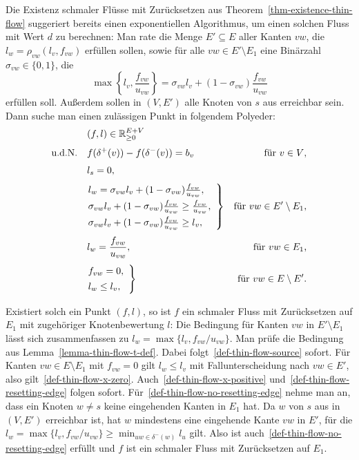 Die Existenz schmaler Flüsse mit Zurücksetzen aus Theorem~\ref{thm-existence-thin-flow} suggeriert bereits einen exponentiellen Algorithmus, um einen solchen Fluss mit Wert $d$ zu berechnen:
Man rate die Menge $E'\subseteq E$ aller Kanten $vw$, die $l_w = \rho_{vw}(l_v, f_{vw})$ erfüllen sollen, sowie für alle $vw\in E'\setminus E_1$ eine Binärzahl $\sigma_{vw}\in\{0,1\}$, die \[
\max\left\{ l_v, \frac{f_{vw}}{u_{vw}}\right\} = \sigma_{vw} l_v + (1-\sigma_{vw}) \frac{f_{vw}}{u_{vw}}
\] erfüllen soll.
Außerdem sollen in $(V, E')$ alle Knoten von $s$ aus erreichbar sein.
Dann suche man einen zulässigen Punkt in folgendem Polyeder:
\begin{align*}
	& (f, l) \in \R_{\geq 0}^{E + V} \\[0.3em]
	\text{u.d.N.}\quad &
	f(\delta^+(v)) - f(\delta^-(v)) = b_v& \text{für $v\in V$,} \\[0.3em]
	& l_s = 0, \\[0.3em]
	&\mathopen{}\left.\begin{array}{@{}l}
		l_w = \sigma_{vw} l_v + (1-\sigma_{vw}) \frac{f_{vw}}{u_{vw}},\\[0.4em]
		\sigma_{vw} l_v + (1-\sigma_{vw}) \frac{f_{vw}}{u_{vw}} \geq \frac{f_{vw}}{u_{vw}},\\[0.4em]
		\sigma_{vw} l_v + (1-\sigma_{vw}) \frac{f_{vw}}{u_{vw}} \geq l_v,
	\end{array} \right\}\mathclose{}
	& \text{für $vw\in E'\setminus E_1$},\\[0.3em]
	& l_w = \frac{f_{vw}}{u_{vw}}, & \text{für $vw\in E_1$,} \\[0.3em]
	& \mathopen{}\left.\begin{array}{@{}l}
	f_{vw} = 0,\\[0.4em]
	l_w \leq l_v,
	\end{array} \right\}\mathclose{} & \text{für $vw\in E\setminus E'$.}
\end{align*}

Existiert solch ein Punkt $(f, l)$, so ist $f$ ein schmaler Fluss mit Zurücksetzen auf $E_1$ mit zugehöriger Knotenbewertung $l$:
Die Bedingung für Kanten $vw$ in $E'\setminus E_1$ lässt sich zusammenfassen zu $l_w = \max \{ l_v, f_{vw}/u_{vw} \}$.
Man prüfe die Bedingung aus Lemma~\ref{lemma-thin-flow-t-def}.
Dabei folgt~\ref{def-thin-flow-source} sofort.
Für Kanten $vw\in E\setminus E_1$ mit $f_{vw} = 0$ gilt $l_w \leq l_v$ mit Fallunterscheidung nach $vw\in E'$, also gilt~\ref{def-thin-flow-x-zero}.
Auch~\ref{def-thin-flow-x-positive} und~\ref{def-thin-flow-resetting-edge} folgen sofort.
Für~\ref{def-thin-flow-no-resetting-edge} nehme man an, dass ein Knoten $w\neq s$ keine eingehenden Kanten in $E_1$ hat.
Da $w$ von $s$ aus in $(V, E')$ erreichbar ist, hat $w$ mindestens eine eingehende Kante $vw$ in $E'$, für die $l_w = \max\{ l_v, f_{vw}/u_{vw} \} \geq \min_{uw\in\delta^-(w)} l_u$ gilt.
Also ist auch~\ref{def-thin-flow-no-resetting-edge} erfüllt und $f$ ist ein schmaler Fluss mit Zurücksetzen auf $E_1$.

